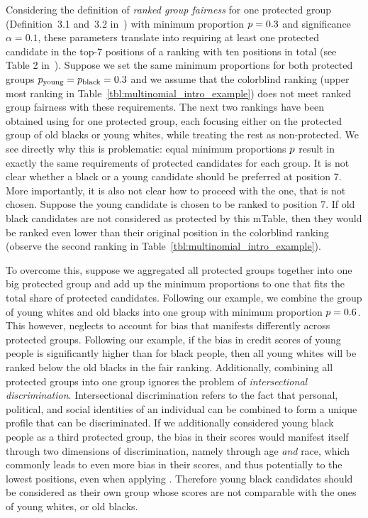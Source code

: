 Considering the definition of \textit{ranked group fairness} for one protected group (Definition~3.1 and~3.2 in~\cite{zehlike2017fair}) with minimum proportion $p=0.3$ and significance $\alpha=0.1$, these parameters translate into requiring at least one protected candidate in the top-7 positions of a ranking with ten positions in total (see Table 2 in~\cite{zehlike2017fair}).
%
Suppose we set the same minimum proportions for both protected groups $p_{\text{young}} = p_{\text{black}} = 0.3$ and we assume that the colorblind ranking (upper most ranking in Table~\ref{tbl:multinomial_intro_example}) does not meet ranked group fairness with these requirements.
%
The next two rankings have been obtained using \algoFAIR for one protected group, each focusing either on the protected group of old blacks or young whites, while treating the rest as non-protected.
%
We see directly why this is problematic: equal minimum proportions $p$ result in exactly the same requirements of protected candidates for each group.
%
It is not clear whether a black or a young candidate should be preferred at position 7.
%
More importantly, it is also not clear how to proceed with the one, that is not chosen.
%
Suppose the young candidate is chosen to be ranked to position 7.
%
If old black candidates are not considered as protected by this mTable, then they would be ranked even lower than their original position in the colorblind ranking (observe the second ranking in Table~\ref{tbl:multinomial_intro_example}).

To overcome this, suppose we aggregated all protected groups together into one big protected group and add up the minimum proportions to one that fits the total share of protected candidates.
%
Following our example, we combine the group of young whites and old blacks into one group with minimum proportion $p=0.6$.
%
This however, neglects to account for bias that manifests differently across protected groups.
%
Following our example, if the bias in credit scores of young people is significantly higher than for black people, then all young whites will be ranked below the old blacks in the fair ranking.
%
Additionally, combining all protected groups into one group ignores the problem of \emph{intersectional discrimination}.
%
Intersectional discrimination refers to the fact that personal, political, and social identities of an individual can be combined to form a unique profile that can be discriminated.
%
If we additionally considered young black people as a third protected group, the bias in their scores would manifest itself through two dimensions of discrimination, namely through age \emph{and} race, which commonly leads to even more bias in their scores, and thus potentially to the lowest positions, even when applying \algoFAIR.
%
Therefore young black candidates should be considered as their own group whose scores are not comparable with the ones of young whites, or old blacks.

